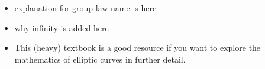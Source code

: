 \documentclass{article}
\begin{document}
\begin{itemize}
    \item explanation for group law name is \href{https://www.math.brown.edu/reschwar/M1540B/elliptic.pdf}{here}
    \item why infinity is added \href{https://crypto.stackexchange.com/questions/70507/in-elliptic-curve-what-does-the-point-at-infinity-look-like}{here}
    \item This (heavy) textbook is a good resource if you want to explore the mathematics of elliptic curves in further detail.
\end{itemize}
\end{document}
